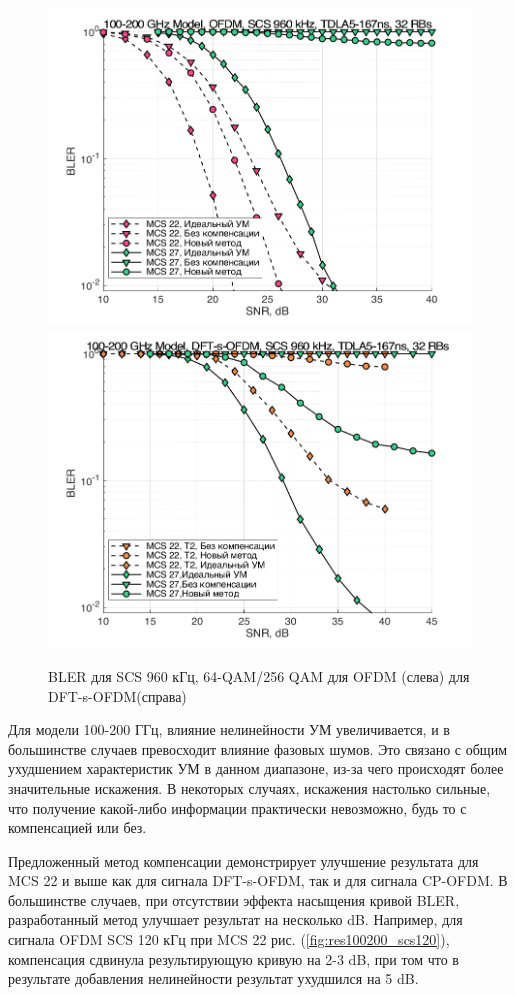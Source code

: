\begin{figure}[h!]
    \centering
    \includegraphics[width=0.49\linewidth]{figs/res/ofdm/OFDM_SubTHz_SCS960_MCS22_27.png}
    \includegraphics[width=0.49\linewidth]{figs/res/dftsofdm/DFT-s-OFDM_SubTHz_SCS960_MCS22_27.png}
    \caption{BLER для SCS 960 кГц, 64-QAM/256 QAM для OFDM (слева) для DFT-s-OFDM(справа)}
    \label{fig:res100200_scs960}
\end{figure}

Для модели 100-200 ГГц, влияние нелинейности УМ увеличивается, и в
большинстве случаев превосходит влияние фазовых шумов. Это связано с общим
ухудшением характеристик УМ в данном диапазоне, из-за чего происходят более
значительные искажения. В некоторых случаях, искажения настолько сильные,
что получение какой-либо информации практически невозможно, будь то с
компенсацией или без.

Предложенный метод компенсации демонстрирует улучшение результата для MCS
22 и выше как для сигнала DFT-s-OFDM, так и для сигнала CP-OFDM. В
большинстве случаев, при отсутствии эффекта насыщения кривой BLER,
разработанный метод улучшает результат на несколько dB. Например, для
сигнала OFDM SCS 120 кГц при MCS 22 рис. (\ref{fig:res100200_scs120}),
компенсация сдвинула результирующую кривую на 2-3 dB, при том что в
результате добавления нелинейности результат ухудшился на 5 dB. 


